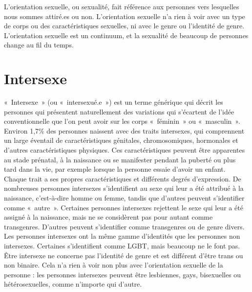 \documentclass[12pt,openany]{book}
\begin{document}
\noindent L’orientation sexuelle, ou sexualité, fait référence aux personnes vers lesquelles nous sommes attiré.es ou non. L’orientation sexuelle n’a rien à voir avec un type de corps ou des caractéristiques sexuelles, ni avec le genre ou l’identité de genre. L’orientation sexuelle est un continuum, et la sexualité de beaucoup de personnes change au fil du temps.

\section*{Intersexe}

\noindent \mbox{« Intersexe »} (ou \mbox{« intersexué.e »}) est un terme générique qui décrit les personnes qui présentent naturellement des variations qui s’écartent de l’idée conventionnelle que l’on peut avoir sur les corps \mbox{« féminin »} ou \mbox{« masculin »}. Environ 1,7\% des personnes naissent avec des traits intersexes, qui comprennent un large éventail de caractéristiques génitales, chromosomiques, hormonales et d’autres caractéristiques physiques. Ces caractéristiques peuvent être apparentes au stade prénatal, à la naissance ou se manifester pendant la puberté ou plus tard dans la vie, par exemple lorsque la personne essaie d’avoir un enfant.
Chaque trait a ses propres caractéristiques et différents degrés d’expression. De nombreuses personnes intersexes s’identifient au sexe qui leur a été attribué à la naissance, c’est-à-dire homme ou femme, tandis que d’autres peuvent s’identifier comme \mbox{« autre »}. Certaines personnes intersexes rejettent le sexe qui leur a été assigné à la naissance, mais ne se considèrent pas pour autant comme transgenres. D’autres peuvent s’identifier comme transgenres ou de genre divers. Les personnes intersexes ont la même gamme d’identités que les personnes non intersexes. Certaines s’identifient comme LGBT, mais beaucoup ne le font pas. Être intersexe ne concerne pas l’identité de genre et est différent d’être trans ou non binaire. Cela n’a rien à voir non plus avec l’orientation sexuelle de la personne : les personnes intersexes peuvent être lesbiennes, gays, bisexuelles ou hétérosexuelles, comme n’importe qui d’autre.

\bigskip
\end{document}

